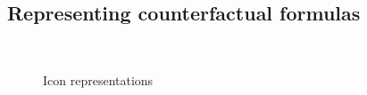 \documentclass[a4paper,american,10pt]{paper}
\theoremstyle{definition}\newtheorem{definition}{Definition}
\begin{document}
\subsection{Representing counterfactual formulas}
\begin{figure}[H]
\centering
\\
\caption{Icon representations}
\end{figure}
\end{document}
